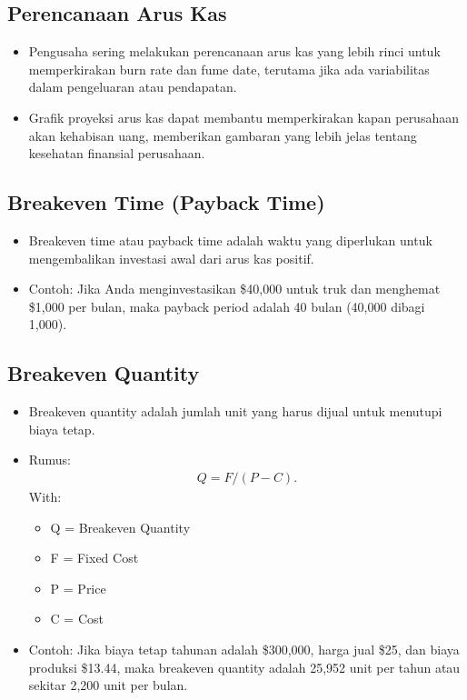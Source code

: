 \documentclass{article}
\begin{document}
\subsection{Perencanaan Arus Kas}
\begin{itemize}
    \item Pengusaha sering melakukan perencanaan arus kas yang lebih rinci untuk memperkirakan burn rate dan fume date, terutama jika ada variabilitas dalam pengeluaran atau pendapatan.
    \item Grafik proyeksi arus kas dapat membantu memperkirakan kapan perusahaan akan kehabisan uang, memberikan gambaran yang lebih jelas tentang kesehatan finansial perusahaan.
\end{itemize}

\subsection{Breakeven Time (Payback Time)}
\begin{itemize}
    \item Breakeven time atau payback time adalah waktu yang diperlukan untuk mengembalikan investasi awal dari arus kas positif.
    \item Contoh: Jika Anda menginvestasikan \$40,000 untuk truk dan menghemat \$1,000 per bulan, maka payback period adalah 40 bulan (40,000 dibagi 1,000).
\end{itemize}

\subsection{Breakeven Quantity}
\begin{itemize}
    \item Breakeven quantity adalah jumlah unit yang harus dijual untuk menutupi biaya tetap.
    \item  Rumus:
          \begin{align*}
              Q = F / (P - C) .
          \end{align*}
          With:
          \begin{itemize}
              \item Q = Breakeven Quantity
              \item F = Fixed Cost
              \item P = Price
              \item C = Cost
          \end{itemize}
    \item Contoh: Jika biaya tetap tahunan adalah \$300,000, harga jual \$25, dan biaya produksi \$13.44, maka breakeven quantity adalah 25,952 unit per tahun atau sekitar 2,200 unit per bulan.
\end{itemize}
\end{document}
